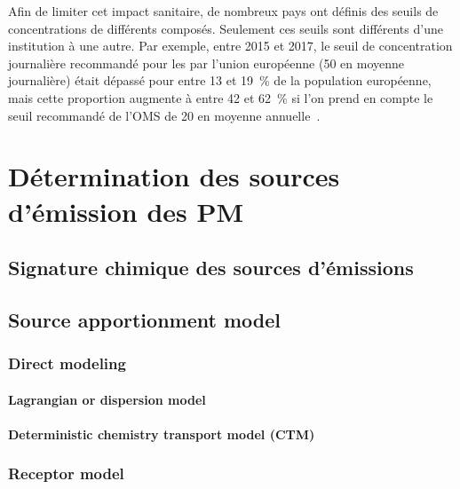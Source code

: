 Afin de limiter cet impact sanitaire, de nombreux pays ont définis des seuils de
concentrations de différents composés. Seulement ces seuils sont différents d'une
institution à une autre. Par exemple, entre 2015 et 2017, le seuil de concentration
journalière recommandé pour les \PMdix{} par l'union européenne (\SI{50}{\ugm} en moyenne
journalière) était dépassé pour entre 13 et 19~\% de la population européenne, mais cette
proportion augmente à entre 42 et 62~\% si l'on prend en compte le seuil recommandé de
l'OMS de \SI{20}{\ugm} en moyenne annuelle~\autocite{europeanenvironmentagencyAir2019}.


\section{Détermination des sources d'émission des PM}%
\label{sec:source_apportionment_of_pm}

\subsection{Signature chimique des sources d'émissions}%
\label{sec:signature_chimique_des_sources_demissions}

\subsection{Source apportionment model}%
\label{sec:source_apportionment_model}

\subsubsection{Direct modeling}%
\label{sub:direct_modeling}

\paragraph{Lagrangian or dispersion model}%
\label{sub:lagrangian_or_dispersion_model}

\paragraph{Deterministic chemistry transport model (CTM)}%
\label{sub:deterministic_chemistry_transport_model_ctm_}

\subsubsection{Receptor model}%
\label{sec:receptor_model}

